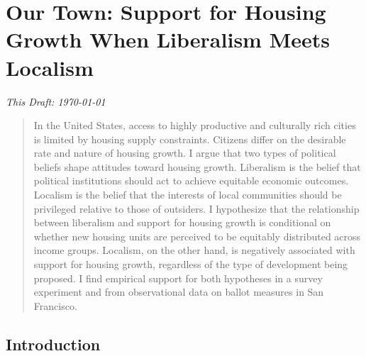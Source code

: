 \documentclass[article,11pt]{memoir}
\begin{document}
\mainmatter

\chapter*{Our Town: Support for Housing Growth When Liberalism Meets Localism}

\emph{This Draft: \today}

\vspace{2em}

\begin{SingleSpace}
\begin{abstract}
In the United States, access to highly productive and culturally rich cities is limited by housing supply constraints. Citizens differ on the desirable rate and nature of housing growth. I argue that two types of political beliefs shape attitudes toward housing growth. Liberalism is the belief that political institutions should act to achieve equitable economic outcomes. Localism is the belief that the interests of local communities should be privileged relative to those of outsiders. I hypothesize that the relationship between liberalism and support for housing growth is conditional on whether new housing units are perceived to be equitably distributed across income groups.  Localism, on the other hand, is negatively associated with support for housing growth, regardless of the type of development being proposed. I find empirical support for both hypotheses in a survey experiment and from observational data on ballot measures in San Francisco. 
\end{abstract}
\end{SingleSpace}

\vspace{2em}

\section{Introduction}\label{sec:introduction}
\end{document}
